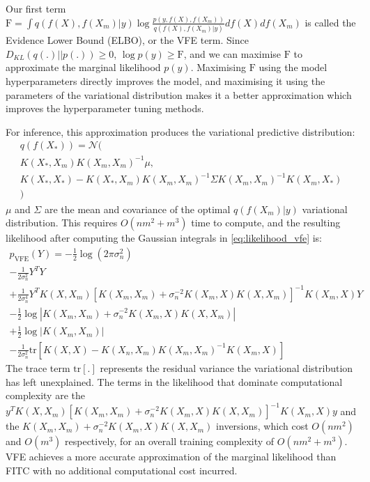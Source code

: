 Our first term $\text{F} = \int q(f(X), f(X_m) | y) \log \frac{p(y, f(X), f(X_m))}{q(f(X), f(X_m) | y)} df(X) df(X_m)$ is called the Evidence Lower Bound (ELBO), or the VFE term. Since $D_{KL}(q(.) || p(.)) \geq 0$, $\log p(y) \geq \text{F}$, and we can maximise $\text{F}$ to approximate the marginal likelihood $p(y)$. Maximising $\text{F}$ using the model hyperparameters directly improves the model, and maximising it using the parameters of the variational distribution makes it a better approximation which improves the hyperparameter tuning methods.

For inference, this approximation produces the variational predictive distribution:
\begin{equation*}
    \begin{aligned}
        q(f(X_*)) = \mathcal{N}( \\
        K(X_*, X_m) K(X_m, X_m)^{-1} \mu, \\
        K(X_*, X_*) - K(X_*, X_m) K(X_m, X_m)^{-1} \Sigma K(X_m, X_m)^{-1} K(X_m, X_*) \\
        )
    \end{aligned}
\end{equation*}
$\mu$ and $\Sigma$ are the mean and covariance of the optimal $q(f(X_m) | y)$ variational distribution. This requires $O(nm^2 + m^3)$ time to compute, and the resulting likelihood after computing the Gaussian integrals in \ref{eq:likelihood_vfe} is:
\begin{equation*}
    \begin{aligned}
        p_{\text{VFE}}(Y) = -\frac{1}{2} \log(2 \pi \sigma_n^2) \\ 
        - \frac{1}{2\sigma_n^2} Y^T Y \\
        + \frac{1}{2\sigma_n^4} Y^T K(X, X_m) [K(X_m, X_m) + \sigma_n^{-2} K(X_m, X) K(X, X_m)]^{-1} K(X_m, X) Y \\
        - \frac{1}{2} \log | K(X_m, X_m) + \sigma_n^{-2} K(X_m, X) K(X, X_m) | \\
        + \frac{1}{2} \log | K(X_m, X_m) | \\
        - \frac{1}{2 \sigma_n^2} \text{tr} \left[ K(X, X) - K(X_n, X_m) K(X_m, X_m)^{-1} K(X_m, X) \right]
    \end{aligned}
\end{equation*}
The trace term $\text{tr}[.]$ represents the residual variance the variational distribution has left unexplained. The terms in the likelihood that dominate computational complexity are the $y^T K(X, X_m) [K(X_m, X_m) + \sigma_n^{-2} K(X_m, X) K(X, X_m)]^{-1} K(X_m, X) y$ and the $K(X_m, X_m) + \sigma_n^{-2} K(X_m, X) K(X, X_m)$ inversions, which cost $O(nm^2)$ and $O(m^3)$ respectively, for an overall training complexity of $O(nm^2 + m^3)$. VFE achieves a more accurate approximation of the marginal likelihood than FITC with no additional computational cost incurred.


